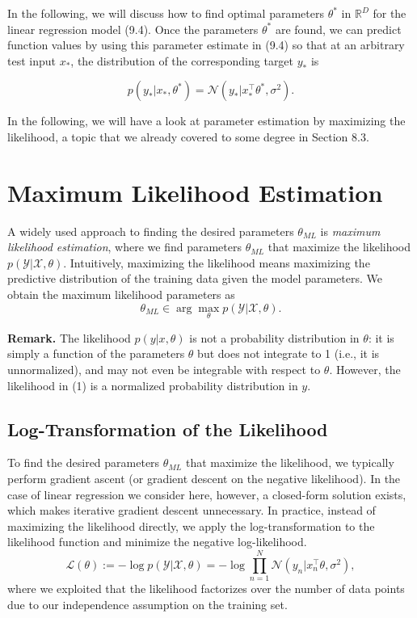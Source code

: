 \documentclass[12pt,openany]{book}
\theoremstyle{definition}
\begin{document}
	In the following, we will discuss how to find optimal parameters \( \theta^* \) in \( \mathbb{R}^D \) for the linear regression model (9.4). Once the parameters \( \theta^* \) are found, we can predict function values by using this parameter estimate in (9.4) so that at an arbitrary test input \( x_* \), the distribution of the corresponding target \( y_* \) is
	
	\begin{equation}
		p(y_* | x_*, \theta^*) = \mathcal{N}(y_* | x_*^\top \theta^*, \sigma^2). \tag{9.6}
	\end{equation}
	
	In the following, we will have a look at parameter estimation by maximizing the likelihood, a topic that we already covered to some degree in Section 8.3.
	\section{Maximum Likelihood Estimation}
	
	A widely used approach to finding the desired parameters $\theta_{ML}$ is \textit{maximum likelihood estimation}, where we find parameters $\theta_{ML}$ that maximize the likelihood $p(\mathcal{Y} | \mathcal{X}, \theta)$. Intuitively, maximizing the likelihood means maximizing the predictive distribution of the training data given the model parameters. We obtain the maximum likelihood parameters as
	\begin{equation}
		\theta_{ML} \in \arg \max_{\theta} p(\mathcal{Y} | \mathcal{X}, \theta).
	\end{equation}
	
	\textbf{Remark.} The likelihood $p(y | x, \theta)$ is not a probability distribution in $\theta$: it is simply a function of the parameters $\theta$ but does not integrate to 1 (i.e., it is unnormalized), and may not even be integrable with respect to $\theta$. However, the likelihood in (1) is a normalized probability distribution in $y$.
	
	\subsection{Log-Transformation of the Likelihood}
	To find the desired parameters $\theta_{ML}$ that maximize the likelihood, we typically perform gradient ascent (or gradient descent on the negative likelihood). In the case of linear regression we consider here, however, a closed-form solution exists, which makes iterative gradient descent unnecessary. In practice, instead of maximizing the likelihood directly, we apply the log-transformation to the likelihood function and minimize the negative log-likelihood.
	\begin{equation}
		\mathcal{L}(\theta) := -\log p(\mathcal{Y} | \mathcal{X}, \theta) = -\log \prod_{n=1}^{N} \mathcal{N}(y_n | x_n^\top \theta, \sigma^2),
	\end{equation}
	where we exploited that the likelihood factorizes over the number of data points due to our independence assumption on the training set.
	
\end{document}

